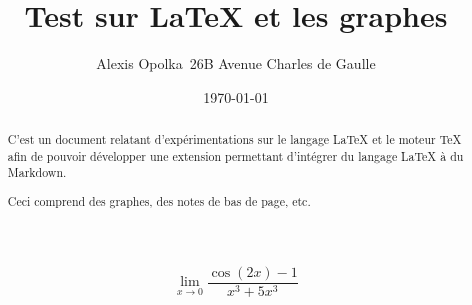 \documentclass{report}
\begin{document}
  \title{Test sur LaTeX et les graphes}
  \author{Alexis Opolka\ 26B Avenue Charles de Gaulle}
  \date{\today}
  \maketitle

  \begin{abstract}
    C'est un document relatant d'expérimentations sur le langage LaTeX et
    le moteur TeX afin de pouvoir développer une extension permettant d'intégrer
    du langage LaTeX à du Markdown.

    Ceci comprend des graphes, des notes de bas de page, etc.
  \end{abstract}

  \tableofcontents
  \listfigurename

  \newpage

  \[
    \lim_{x\to0} \frac{\cos{(2x)} - 1}{x^3 + 5x^3}
  \]


  
\end{document}
